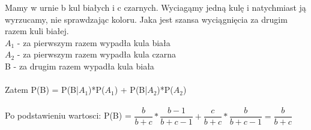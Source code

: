 \medskip
{} 
\medskip

Mamy w urnie b kul białych i c czarnych. Wyciagąmy jedną kulę i natychmiast ją wyrzucamy, nie sprawdzając koloru. Jaka jest szansa wyciągnięcia za drugim razem kuli białej.\\


\noindent
$A_{1}$ - za pierwszym razem wypadła kula biała\\
$A_{2}$ - za pierwszym razem wypadła kula czarna\\
B - za drugim razem wypadła kula biała\\\\
Zatem P(B) = P(B|$A_{1}$)*P($A_{1}$) + P(B|$A_{2}$)*P($A_{2}$)\\\\
Po podstawieniu wartosci:
P(B) = $\dfrac{b}{b+c}*\dfrac{b-1}{b + c - 1} + \dfrac{c}{b+c}*\dfrac{b}{b + c - 1}= \dfrac{b}{b+c}$
